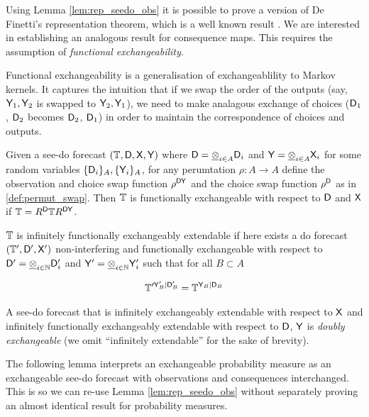 Using Lemma \ref{lem:rep_seedo_obs} it is possible to prove a version of De Finetti's representation theorem, which is a well known result \citep{de_finetti_foresight_1992,hewitt_symmetric_1955}. We are interested in establishing an analogous result for consequence maps. This requires the assumption of \emph{functional exchangeability}.

Functional exchangeability is a generalisation of exchangeablility to Markov kernels. It captures the intuition that if we swap the order of the outputs (say, $\mathsf{Y}_1,\mathsf{Y}_2$ is swapped to $\mathsf{Y}_2, \mathsf{Y}_1$), we need to make analagous exchange of choices ($\mathsf{D}_1$, $\mathsf{D}_2$ becomes $\mathsf{D}_2$, $\mathsf{D}_1$) in order to maintain the correspondence of choices and outputs.

\begin{definition}
Given a see-do forecast $(\mathbb{T},\mathsf{D},\mathsf{X},\mathsf{Y})$ where $\mathsf{D}=\underline{\otimes}_{i\in A}\mathsf{D}_i$ and $\mathsf{Y}=\underline{\otimes}_{i\in A} \mathsf{X}_i$ for some random variables $\{\mathsf{D}_i\}_A, \{\mathsf{Y}_i\}_A$, for any perumtation $\rho:A\to A$ define the observation and choice swap function $\rho^{\mathsf{D}\mathsf{Y}}$ and the choice swap function $\rho^{\mathsf{D}}$ as in \ref{def:permut_swap}. Then $\mathbb{T}$ is functionally exchangeable with respect to $\mathsf{D}$ and $\mathsf{X}$ if $\mathbb{T}=R^{\mathsf{D}}\mathbb{T}R^{\mathsf{D}\mathsf{Y}}$.

$\mathbb{T}$ is infinitely functionally exchangeably extendable if here exists a do forecast $(\mathbb{T}',\mathsf{D}',\mathsf{X}')$ non-interfering and functionally exchangeable with respect to $\mathsf{D}'=\underline{\otimes}_{i\in\mathbb{N}}\mathsf{D}'_i$ and $\mathsf{Y}'=\underline{\otimes}_{i\in\mathbb{N}}\mathsf{Y}'_i$ such that for all $B\subset A$

\begin{align}
    \mathbb{T}^{\prime \mathsf{Y}'_B|\mathsf{D}'_B}=\mathbb{T}^{\mathsf{Y}_B|\mathsf{D}_B} 
\end{align}

A see-do forecast that is infinitely exchangeably extendable with respect to $\mathsf{X}$ and infinitely functionally exchangeably extendable with respect to $\mathsf{D}$, $\mathsf{Y}$ is \emph{doubly exchangeable} (we omit ``infinitely extendable'' for the sake of brevity).

\end{definition}

The following lemma interprets an exchangeable probability measure as an exchangeable see-do forecast with observations and consequences interchanged. This is so we can re-use Lemma \ref{lem:rep_seedo_obs} without separately proving an almost identical result for probability measures.

